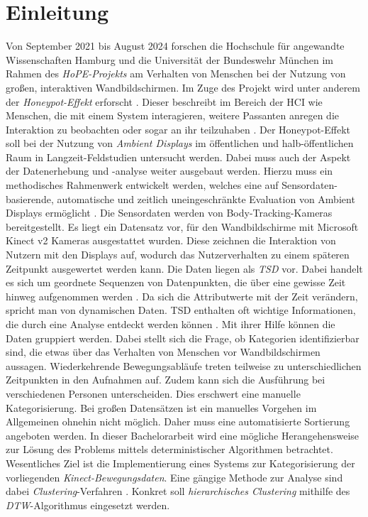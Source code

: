 \chapter{Einleitung}
\label{chapter1}
Von September 2021 bis August 2024 forschen die Hochschule für angewandte Wissenschaften Hamburg
und die Universität der Bundeswehr München im Rahmen des \emph{HoPE-Projekts} am Verhalten
von Menschen bei der Nutzung von großen, interaktiven Wandbildschirmen.
Im Zuge des Projekt wird unter anderem der \emph{Honeypot-Effekt} erforscht \citep{unibw_honeypot-effekt_2021}.
Dieser beschreibt im Bereich der \ac{HCI} wie Menschen, die mit einem System interagieren,
weitere Passanten anregen die Interaktion zu beobachten oder sogar an ihr teilzuhaben \citep{wouters_uncovering_2016}.
Der Honeypot-Effekt soll bei der Nutzung von \emph{Ambient Displays} im öffentlichen
und halb-öffentlichen Raum in Langzeit-Feldstudien untersucht werden.
Dabei muss auch der Aspekt der Datenerhebung und -analyse weiter ausgebaut werden.
Hierzu muss ein methodisches Rahmenwerk entwickelt werden, welches eine auf Sensordaten-basierende,
automatische und zeitlich uneingeschränkte Evaluation von Ambient Displays ermöglicht \citep{unibw_honeypot-effekt_2021}.
Die Sensordaten werden von Body-Tracking-Kameras bereitgestellt.
Es liegt ein Datensatz vor, für den Wandbildschirme mit Microsoft Kinect v2 Kameras ausgestattet wurden.
Diese zeichnen die Interaktion von Nutzern mit den Displays auf,
wodurch das Nutzerverhalten zu einem späteren Zeitpunkt ausgewertet werden kann.
Die Daten liegen als \emph{\ac{TSD}} vor.
Dabei handelt es sich um geordnete Sequenzen von Datenpunkten,
die über eine gewisse Zeit hinweg aufgenommen werden \citep{ali_clustering_2019}.
Da sich die Attributwerte mit der Zeit verändern, spricht man von dynamischen Daten.
\ac{TSD} enthalten oft wichtige Informationen, die durch eine Analyse entdeckt werden können \citep{ali_clustering_2019}.
Mit ihrer Hilfe können die Daten gruppiert werden.
Dabei stellt sich die Frage, ob Kategorien identifizierbar sind,
die etwas über das Verhalten von Menschen vor Wandbildschirmen aussagen.
Wiederkehrende Bewegungsabläufe treten teilweise zu unterschiedlichen Zeitpunkten in den Aufnahmen auf.
Zudem kann sich die Ausführung bei verschiedenen Personen unterscheiden.
Dies erschwert eine manuelle Kategorisierung.
Bei großen Datensätzen ist ein manuelles Vorgehen im Allgemeinen ohnehin nicht möglich.
Daher muss eine automatisierte Sortierung angeboten werden.
In dieser Bachelorarbeit wird eine mögliche Herangehensweise zur Lösung des Problems mittels deterministischer Algorithmen betrachtet.
Wesentliches Ziel ist die Implementierung eines Systems zur Kategorisierung der vorliegenden \emph{Kinect-Bewegungsdaten}.
Eine gängige Methode zur Analyse sind dabei \emph{Clustering}-Verfahren \citep{aghabozorgi_time-series_2015}.
Konkret soll \emph{hierarchisches Clustering} mithilfe des \emph{\ac{DTW}}-Algorithmus eingesetzt werden.

